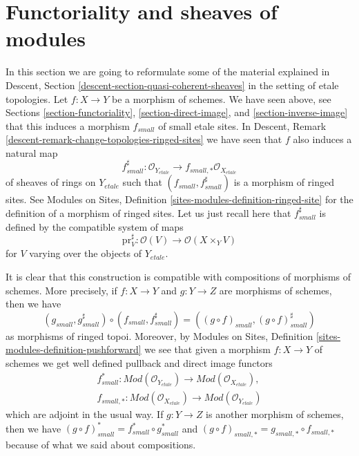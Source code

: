 \section{Functoriality and sheaves of modules}
\label{section-morphisms-modules}

\noindent
In this section we are going to reformulate some of the material explained in
Descent, Section \ref{descent-section-quasi-coherent-sheaves}
in the setting of etale topologies. Let $f : X \to Y$ be a morphism of schemes.
We have seen above, see
Sections \ref{section-functoriality}, \ref{section-direct-image}, and
\ref{section-inverse-image}
that this induces a morphism $f_{small}$ of small etale sites. In
Descent, Remark \ref{descent-remark-change-topologies-ringed-sites}
we have seen that $f$ also induces a natural map
$$
f_{small}^\sharp :
\mathcal{O}_{Y_{etale}}
\longrightarrow
f_{small, *}\mathcal{O}_{X_{etale}}
$$
of sheaves of rings on $Y_{etale}$ such that $(f_{small}, f_{small}^\sharp)$
is a morphism of ringed sites. See
Modules on Sites, Definition \ref{sites-modules-definition-ringed-site}
for the definition of a morphism of ringed sites.
Let us just recall here that $f_{small}^\sharp$ is defined by the
compatible system of maps
$$
\text{pr}_V^\sharp : \mathcal{O}(V) \longrightarrow \mathcal{O}(X \times_Y V)
$$
for $V$ varying over the objects of $Y_{etale}$.

\medskip\noindent
It is clear that this construction is compatible with compositions of
morphisms of schemes. More precisely, if $f : X \to Y$ and $g : Y \to Z$
are morphisms of schemes, then we have
$$
(g_{small}, g_{small}^\sharp)
\circ
(f_{small}, f_{small}^\sharp)
=
((g \circ f)_{small}, (g \circ f)_{small}^\sharp)
$$
as morphisms of ringed topoi. Moreover, by
Modules on Sites, Definition \ref{sites-modules-definition-pushforward}
we see that given a morphism $f : X \to Y$ of schemes
we get well defined pullback and direct image functors
\begin{align*}
f_{small}^* :
\textit{Mod}(\mathcal{O}_{Y_{etale}})
\longrightarrow
\textit{Mod}(\mathcal{O}_{X_{etale}}),\\
f_{small, *} :
\textit{Mod}(\mathcal{O}_{X_{etale}})
\longrightarrow
\textit{Mod}(\mathcal{O}_{Y_{etale}})
\end{align*}
which are adjoint in the usual way. If $g : Y \to Z$ is another morphism
of schemes, then we have
$(g \circ f)_{small}^* = f_{small}^* \circ g_{small}^*$
and $(g \circ f)_{small, *} = g_{small, *} \circ f_{small, *}$
because of what we said about compositions.


